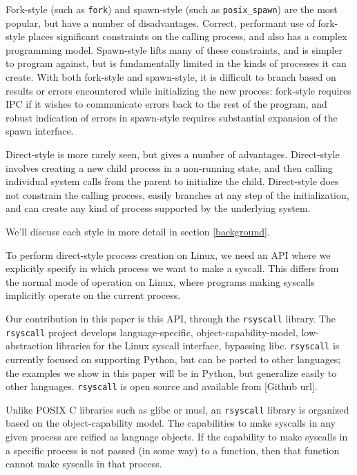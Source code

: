 \documentclass[letterpaper,twocolumn,10pt]{article}
\begin{document}
Fork-style (such as \texttt{fork}) and spawn-style (such as \texttt{posix\_spawn}) are the most popular,
but have a number of disadvantages.
Correct, performant use of fork-style places significant constraints on the calling process,
and also has a complex programming model.
Spawn-style lifts many of these constraints, and is simpler to program against,
but is fundamentally limited in the kinds of processes it can create.
With both fork-style and spawn-style,
it is difficult to
branch based on results or errors encountered while initializing the new process:
fork-style requires IPC if it wishes to communicate errors back to the rest of the program,
and robust indication of errors in spawn-style requires substantial expansion of the spawn interface.

Direct-style is more rarely seen, but gives a number of advantages.
Direct-style involves creating a new child process in a non-running state,
and then calling individual system calls from the parent to initialize the child.
Direct-style does not constrain the calling process,
easily branches at any step of the initialization,
and can create any kind of process supported by the underlying system.

We'll discuss each style in more detail in section \ref{background}.

To perform direct-style process creation on Linux,
we need an API where we explicitly specify in which process we want to make a syscall.
This differs from the normal mode of operation on Linux,
where programs making syscalls implicitly operate on the current process.

Our contribution in this paper is this API, through the \texttt{rsyscall} library.
The \texttt{rsyscall} project develops
language-specific, object-capability-model, low-abstraction libraries for the Linux syscall interface,
bypassing libc.
\texttt{rsyscall} is currently focused on supporting Python,
but can be ported to other languages;
the examples we show in this paper will be in Python,
but generalize easily to other languages.
\texttt{rsyscall} is open source and available from
[Github url].

Unlike POSIX C libraries such as glibc or musl,
an \texttt{rsyscall} library is organized based on the object-capability model.
The capabilities to make syscalls in any given process are reified as language objects.
If the capability to make syscalls in a specific process is not passed (in some way) to a function,
then that function cannot make syscalls in that process.
\end{document}
